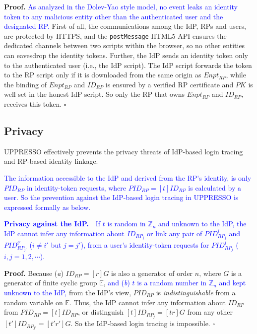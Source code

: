\vspace{0.75mm}
\noindent\textbf{Proof.}
\textcolor{blue}{As analyzed in the Dolev-Yao style model, no event leaks an identity token to any malicious entity other than the authenticated user and the designated RP.}
First of all, the communications among the IdP, RPs and users,
    are protected by HTTPS,
    and the \verb+postMessage+ HTML5 API ensures the dedicated channels between two scripts within the browser,
    so no other entities can eavesdrop the identity tokens.
Further, the IdP sends an identity token only to the authenticated user
        (i.e., the IdP script).
The IdP script forwards the token to the RP script
 only if it is downloaded from the same origin as $Enpt_{RP}$,
while the binding of $Enpt_{RP}$ and $ID_{RP}$ is ensured by a verified RP certificate
    and $PK$ is well set in the honest IdP script.
So only the RP that owns $Enpt_{RP}$ and $ID_{RP}$,
    receives this token. $\square$



\subsection{Privacy}
\label{sec-:analysis}
UPPRESSO effectively prevents the privacy threats of IdP-based login tracing and RP-based identity linkage.

\textcolor{blue}{The information accessible to the IdP and derived from the RP's identity,
    is only $PID_{RP}$ in identity-token requests, where $PID_{RP} = [t]ID_{RP}$ is calculated by a user.
So the prevention against the IdP-based login tracing in UPPRESSO
    is expressed formally as below.}

\vspace{1mm}
\noindent\textcolor{blue}{\textbf{Privacy against the IdP.}~~If $t$ is random in $\mathbb{Z}_n$ and unknown to the IdP,
the IdP
 cannot infer any information about $ID_{RP_j}$ or link any pair of $PID_{RP_j}^i$ and $PID_{RP_{j'}}^{i'}$
  ($i \neq i'$ but $j = j'$),
    from a user's identity-token requests for $PID_{RP_j}^i$ ($i,j = 1, 2, \cdots$).}

\vspace{0.75mm}
\noindent\textbf{Proof.}
Because (\emph{a}) $ID_{RP} = [r]G$ is also a generator of order $n$,
        where $G$ is a generator of finite cyclic group $\mathbb{E}$,
    \textcolor{blue}{and (\emph{b}) $t$ is a random number in $\mathbb{Z}_n$ and kept unknown to the IdP,}
 from the IdP's view,
 $PID_{RP}$
is \emph{indistinguishable} from a random variable on $\mathbb{E}$.
Thus,
    the IdP cannot infer any information about $ID_{RP}$ from $PID_{RP} = [t]ID_{RP}$,
or distinguish $[t]ID_{RP_j} = [tr]G$ from any other $[t']ID_{RP_{j'}} = [t'r']G$.
So the IdP-based login tracing is impossible. $\square$

